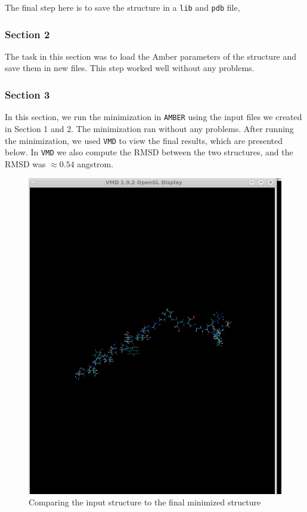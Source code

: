 \documentclass[11pt]{article}
\makeatletter
\def\maxwidth{\ifdim\Gin@nat@width>\linewidth\linewidth
    \else\Gin@nat@width\fi}
\let\Oldincludegraphics\includegraphics
\renewcommand{\includegraphics}[1]{\Oldincludegraphics[width=.8\maxwidth]{#1}}
\makeatother
\begin{document}
The final step here is to save the structure in a \texttt{lib} and
\texttt{pdb} file,

\subsubsection{Section 2}\label{section-2}

The task in this section was to load the Amber parameters of the
structure and save them in new files. This step worked well without any
problems.

\subsubsection{Section 3}\label{section-3}

In this section, we run the minimization in \texttt{AMBER} using the
input files we created in Section 1 and 2. The minimization ran without
any problems. After running the minimization, we used \texttt{VMD} to
view the final results, which are presented below. In \texttt{VMD} we
also compute the RMSD between the two structures, and the RMSD was
\(\approx 0.54\) angstrom.

\begin{figure}
\centering
\includegraphics{Screenshot_input_and_final.png}
\caption{Comparing the input structure to the final minimized structure}
\end{figure}
\end{document}
